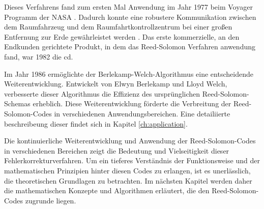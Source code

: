 Dieses Verfahrens fand zum ersten Mal Anwendung im Jahr 1977 beim Voyager Programm der NASA \cite{wickerReedSolomonCodes1994}. 
Dadurch konnte eine robustere Kommunikation zwischen dem Raumfahrzeug und dem Raumfahrtkontrollzentrum bei einer großen Entfernung zur Erde gewährleistet werden \cite{ludwigVoyagerTelecommunications2002}.
Das erste kommerzielle, an den Endkunden gerichtete Produkt, in dem das Reed-Solomon Verfahren anwendung fand, war 1982 die \acrfull{cd}.

Im Jahr 1986 ermöglichte der Berlekamp-Welch-Algorithmus eine entscheidende Weiterentwicklung. Entwickelt von Elwyn Berlekamp und Lloyd Welch, verbesserte dieser Algorithmus die Effizienz des ursprünglichen Reed-Solomon-Schemas erheblich. Diese Weiterentwicklung förderte die Verbreitung der Reed-Solomon-Codes in verschiedenen Anwendungsbereichen. Eine detailiierte beschreibeung dieser findet sich in Kapitel \ref{ch:application}.

Die kontinuierliche Weiterentwicklung und Anwendung der Reed-Solomon-Codes in verschiedenen Bereichen zeigt die Bedeutung und Vielseitigkeit dieser Fehlerkorrekturverfahren. Um ein tieferes Verständnis der Funktionsweise und der mathematischen Prinzipien hinter diesen Codes zu erlangen, ist es unerlässlich, die theoretischen Grundlagen zu betrachten. Im nächsten Kapitel werden daher die mathematischen Konzepte und Algorithmen erläutert, die den Reed-Solomon-Codes zugrunde liegen.